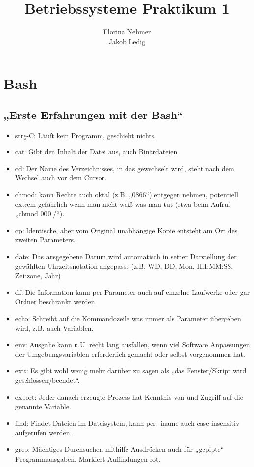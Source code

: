 \documentclass[]{scrartcl}
\title{Betriebssysteme Praktikum 1}
\author{Florina Nehmer\\
Jakob Ledig}
\begin{document}
\maketitle

\section{Bash}

\subsection{„Erste Erfahrungen mit der Bash“}
\begin{itemize}
	\item strg-C: Läuft kein Programm, geschieht nichts.
	\item cat: Gibt den Inhalt der Datei aus, auch Binärdateien
	\item cd: Der Name des Verzeichnisses, in das gewechselt wird, steht nach dem Wechsel auch vor dem Cursor.
	\item chmod: kann Rechte auch oktal (z.B. „0866“) entgegen nehmen, potentiell extrem gefährlich wenn man nicht weiß was man tut (etwa beim Aufruf „chmod 000 /“).
	\item cp: Identische, aber vom Original unabhängige Kopie entsteht am Ort des zweiten Parameters.
	\item date: Das ausgegebene Datum wird automatisch in seiner Darstellung der gewählten Uhrzeitsnotation angepasst (z.B. WD, DD, Mon, HH:MM:SS, Zeitzone, Jahr)
	\item df: Die Information kann per Parameter auch auf einzelne Laufwerke oder gar Ordner beschränkt werden.
	\item echo: Schreibt auf die Kommandozeile was immer als Parameter übergeben wird, z.B. auch Variablen.
	\item env: Ausgabe kann u.U. recht lang ausfallen, wenn viel Software Anpassungen der Umgebungsvariablen erforderlich gemacht oder selbst vorgenommen hat.
	\item exit: Es gibt wohl wenig mehr darüber zu sagen als „das Fenster/Skript wird geschlossen/beendet“.
	\item export: Jeder danach erzeugte Prozess hat Kenntnis von und Zugriff auf die genannte Variable.
	\item find: Findet Dateien im Dateisystem, kann per -iname auch case-insensitiv aufgerufen werden.
	\item grep: Mächtiges Durchsuchen mithilfe Ausdrücken auch für „gepipte“ Programmausgaben. Markiert Auffindungen rot.

\end{itemize}
\end{document}
